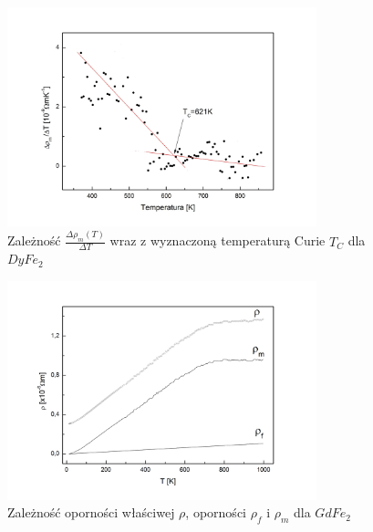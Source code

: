 \documentclass[a4paper,12pt]{article}
\numberwithin{equation}{section}
\begin{document}
\begin{figure}[ht]
    \centering
    \includegraphics[width =0.8\textwidth]{../img/opor/pochodnaDy}
    \caption{Zależność $\frac{\Delta\rho_m(T)}{\Delta T}$ wraz z wyznaczoną temperaturą Curie $T_C$ dla $DyFe_2$}
    \label{skladoweDy}
\end{figure}



\begin{figure}[ht]
    \centering
    \includegraphics[width =0.8\textwidth]{../img/opor/skladoweGd}
    \caption{Zależność oporności właściwej $\rho$, oporności $\rho_f$ i $\rho_m$ dla $GdFe_2$}
    \label{skladoweGd}
\end{figure}
\end{document}
